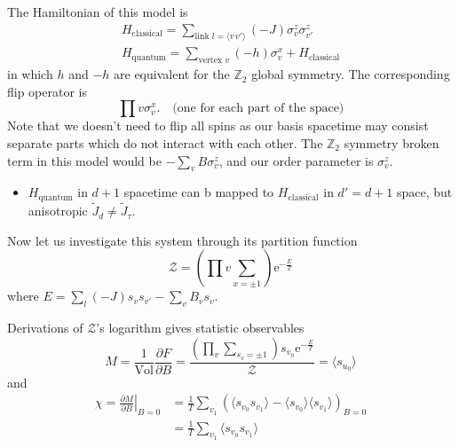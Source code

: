 The Hamiltonian of this model is
\begin{equation}
  \begin{gathered}
  H_{\text{classical}} = \sum_{\text{link $l=\langle v\,v' \rangle$}} (-J) \sigma _{v}^{z} \sigma _{v'}^{z}
  \\
  H_{\text{quantum}} = \sum_{\text{vertex $v$}} (-h) \sigma _{v}^{x}+ H_{\text{classical}}
  \end{gathered}
\end{equation}
in which $h$ and $-h$ are equivalent for the $\mathbb{Z}_2$ global symmetry. The corresponding flip operator is
\begin{equation}
  \prod{v} \sigma _{v}^{x}. \quad \text{(one for each part of the space)}
\end{equation}
Note that we doesn't need to flip all spins as our basis spacetime may consist separate parts which do not interact with each other.
The $\mathbb{Z}_2$ symmetry broken term in this model would be $- \sum_{v} B \sigma _{v}^{z}$, and our order parameter is $\sigma _{v}^{z}$.
\begin{itemize}
  \item $H_{\text{quantum}}$ in $d+1$ spacetime can b mapped to $H_{\text{classical}}$ in $d'=d+1$ space, but anisotropic $\tilde{J}_{d}\neq \tilde{J}_{\tau }$.
\end{itemize}

Now let us investigate this system through its partition function
\begin{equation}
  \mathcal{Z} = \left( \prod{v} \sum_{x=\pm 1}  \right)\mathrm{e}^{-\frac{E}{T}}
\end{equation}
where $E = \sum_{l} (-J) s_v s_{v'} - \sum_{v} B_v s_v$. 

Derivations of $\mathcal{Z}$'s logarithm gives statistic observables
\begin{equation}
  M = \frac{1}{\text{Vol}} \frac{\partial F}{\partial B} = \frac{\left( \prod_{v} \sum_{s_v = \pm 1}  \right) s_{v_0} \mathrm{e}^{-\frac{E}{T}}}{\mathcal{Z}} = \langle s_{u_0}\rangle
\end{equation}
and
\begin{equation}
  \begin{aligned}
    \chi = \left. \frac{\partial M}{\partial B} \right|_{B=0} 
    & = \frac{1}{T} \sum_{v_1} \left( \langle s_{v_0} s_{v_1} \rangle - \langle s_{v_0}\rangle \langle s_{v_1}\rangle \right)_{B=0} \\
    & = \frac{1}{T} \sum_{v_1} \langle s_{v_0} s_{v_1}\rangle
  \end{aligned}
\end{equation}

